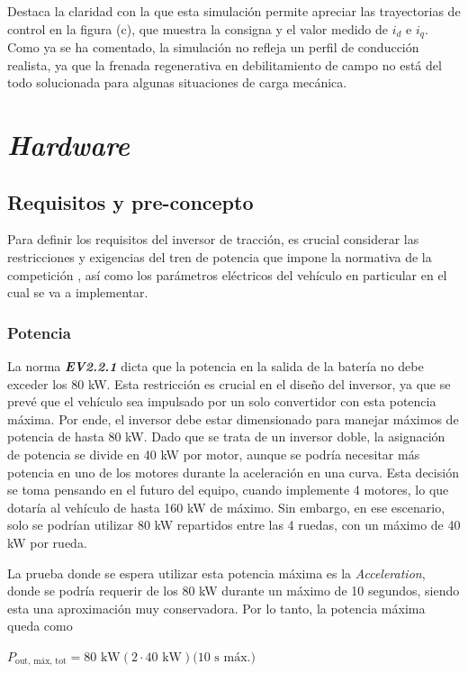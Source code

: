 Destaca la claridad con la que esta simulación permite apreciar las trayectorias de control en la figura (c), que muestra la consigna y el valor medido de $i_d$ e $i_q$. Como ya se ha comentado, la simulación no refleja un perfil de conducción realista, ya que la frenada regenerativa en debilitamiento de campo no está del todo solucionada para algunas situaciones de carga mecánica.


\newpage
\section{\textit{Hardware}}

\subsection{Requisitos y pre-concepto}

Para definir los requisitos del inversor de tracción, es crucial considerar las restricciones y exigencias del tren de potencia que impone la normativa de la competición \cite{FSG}, así como los parámetros eléctricos del vehículo en particular en el cual se va a implementar.

\subsubsection{Potencia}
La norma \textit{\textbf{EV2.2.1}} \cite{FSG} dicta que la potencia en la salida de la batería no debe exceder los 80 kW. Esta restricción es crucial en el diseño del inversor, ya que se prevé que el vehículo sea impulsado por un solo convertidor con esta potencia máxima. Por ende, el inversor debe estar dimensionado para manejar máximos de potencia de hasta 80 kW. Dado que se trata de un inversor doble, la asignación de potencia se divide en 40 kW por motor, aunque se podría necesitar más potencia en uno de los motores durante la aceleración en una curva. Esta decisión se toma pensando en el futuro del equipo, cuando implemente 4 motores, lo que dotaría al vehículo de hasta 160 kW de máximo. Sin embargo, en ese escenario, solo se podrían utilizar 80 kW repartidos entre las 4 ruedas, con un máximo de 40 kW por rueda.

La prueba donde se espera utilizar esta potencia máxima es la \textit{Acceleration}, donde se podría requerir de los 80 kW durante un máximo de 10 segundos, siendo esta una aproximación muy conservadora. Por lo tanto, la potencia máxima queda como

\(P_{\text{out, máx, tot}} = 80 \text{ kW} (2 \cdot 40 \text{ kW}) \text{(10 s máx.)}\)


